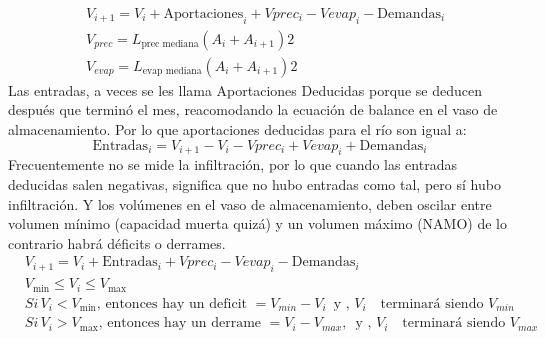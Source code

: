 \begin{align}
    &V_{i+1}=V_i+\text{Aportaciones}_i +Vprec_i -Vevap_i-\text{Demandas}_i\\
    &V_{prec} = L_{\text{prec mediana}} (A_i+ A_{i+ 1})2\\
    &V_{evap}= L_{\text{evap mediana}}(A_i+A_{i+1})2
\end{align}
Las entradas, a veces se les llama Aportaciones Deducidas porque se deducen después que terminó el mes, reacomodando la ecuación de balance en el vaso de almacenamiento. Por lo que aportaciones deducidas para el río son igual a:
\begin{equation}
    \text{Entradas}_i=V_{i+1}-V_i -Vprec_i +Vevap_i+\text{Demandas}_i
\end{equation}
Frecuentemente no se mide la infiltración, por lo que cuando las entradas deducidas salen negativas, significa que no hubo entradas como tal, pero sí hubo infiltración.
Y los volúmenes en el vaso de almacenamiento, deben oscilar entre volumen mínimo (capacidad muerta quizá) y un volumen máximo (NAMO) de lo contrario habrá déficits o derrames.
\begin{align}
    &V_{i + 1}= V_i+ \text{Entradas}_i +Vprec_i -Vevap_i -\text{Demandas}_i\\
    &V_{\min }\leq V_i\leq V_{\max}\\
    &Si\, V_i<V_{\min },\, \text{entonces hay un deficit } =V_{min}- V_i\, \text{ y },\, V_i\quad  \text{terminará siendo } V_{min}\\
    &Si\, V_i> V_{\max },\,\text{entonces hay un derrame } = V_i- V_{max},\, \text{ y },\, V_i\quad \text{terminará siendo } V_{max}
\end{align}
